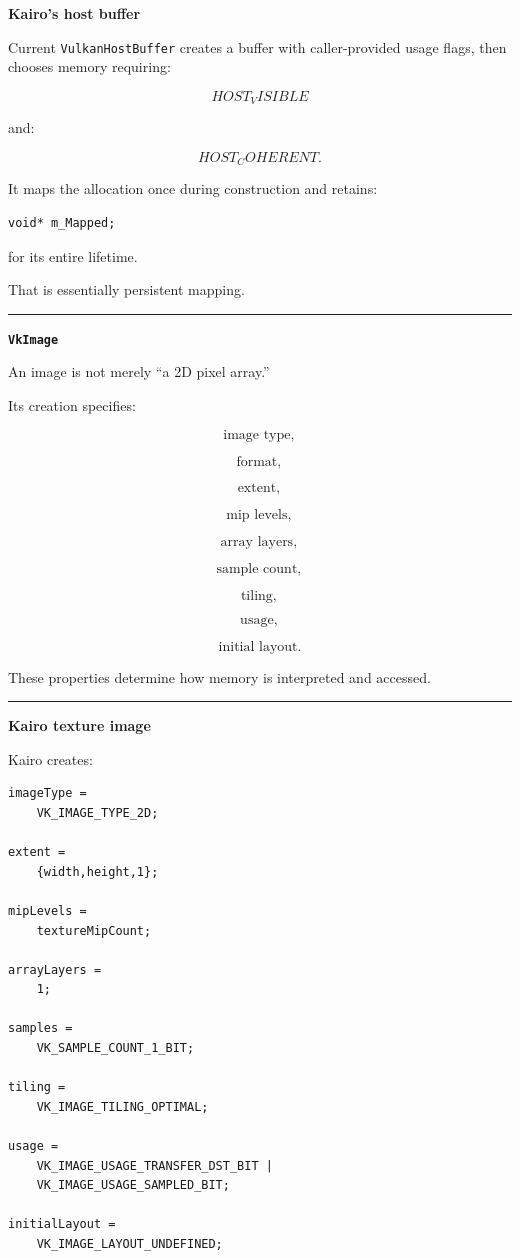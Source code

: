 \textbf{Kairo's host buffer}

Current \texttt{VulkanHostBuffer} creates a buffer with caller-provided usage flags, then chooses memory requiring:

\[
HOST_VISIBLE
\]

and:

\[
HOST_COHERENT.
\]

It maps the allocation once during construction and retains:

\begin{verbatim}
void* m_Mapped;
\end{verbatim}

for its entire lifetime.

That is essentially persistent mapping.

\begin{center}\rule{0.5\linewidth}{0.5pt}\end{center}

\textbf{\texttt{VkImage}}

An image is not merely ``a 2D pixel array.''

Its creation specifies:

\[
\text{image type},
\]

\[
\text{format},
\]

\[
\text{extent},
\]

\[
\text{mip levels},
\]

\[
\text{array layers},
\]

\[
\text{sample count},
\]

\[
\text{tiling},
\]

\[
\text{usage},
\]

\[
\text{initial layout}.
\]

These properties determine how memory is interpreted and accessed.

\begin{center}\rule{0.5\linewidth}{0.5pt}\end{center}

\textbf{Kairo texture image}

Kairo creates:

\begin{verbatim}
imageType =
    VK_IMAGE_TYPE_2D;

extent =
    {width,height,1};

mipLevels =
    textureMipCount;

arrayLayers =
    1;

samples =
    VK_SAMPLE_COUNT_1_BIT;

tiling =
    VK_IMAGE_TILING_OPTIMAL;

usage =
    VK_IMAGE_USAGE_TRANSFER_DST_BIT |
    VK_IMAGE_USAGE_SAMPLED_BIT;

initialLayout =
    VK_IMAGE_LAYOUT_UNDEFINED;
\end{verbatim}


